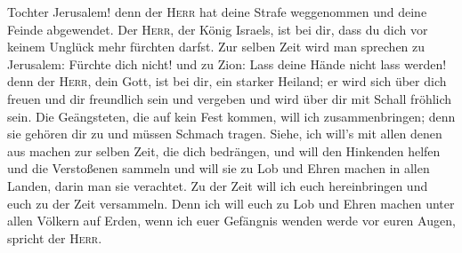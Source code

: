 Tochter Jerusalem!  denn der \textsc{Herr} hat deine
Strafe weggenommen und deine Feinde abgewendet. Der \textsc{Herr}, der
König Israels, ist bei dir, dass du dich vor keinem Unglück mehr
fürchten darfst.  Zur selben Zeit wird man sprechen zu
Jerusalem: Fürchte dich nicht! und zu Zion: Lass deine Hände nicht lass
werden!  denn der \textsc{Herr}, dein Gott, ist bei dir,
ein starker Heiland; er wird sich über dich freuen und dir freundlich
sein und vergeben und wird über dir mit Schall fröhlich sein.
 Die Geängsteten, die auf kein Fest kommen, will ich
zusammenbringen; denn sie gehören dir zu und müssen Schmach tragen.
 Siehe, ich will's mit allen denen aus machen zur selben
Zeit, die dich bedrängen, und will den Hinkenden helfen und die
Verstoßenen sammeln und will sie zu Lob und Ehren machen in allen
Landen, darin man sie verachtet.  Zu der Zeit will ich
euch hereinbringen und euch zu der Zeit versammeln. Denn ich will euch
zu Lob und Ehren machen unter allen Völkern auf Erden, wenn ich euer
Gefängnis wenden werde vor euren Augen, spricht der \textsc{Herr}.
